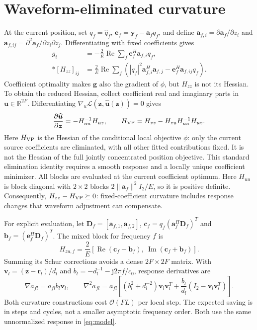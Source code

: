 \documentclass[a4paper,12pt,review]{cas-sc}
\newcommand{\R}{\mathbb R}
\newcommand{\Rea}{\operatorname{Re}}
\begin{document}
\section{Waveform-eliminated curvature}
At the current position, set $q_f=\widehat q_f$, $\bm e_f=\bm y_f-\bm a_fq_f$, and define $\bm a_{f,i}=\partial\bm a_f/\partial z_i$ and $\bm a_{f,ij}=\partial^2\bm a_f/\partial z_i\partial z_j$. Differentiating with fixed coefficients gives
\begin{align}
 g_i&=-\frac{2}{E}\Rea\sum_f\bm e_f^H\bm a_{f,i}q_f,\label{eq:g}\\*
 [H_{zz}]_{ij}&=\frac{2}{E}\Rea\sum_f
 \left(|q_f|^2\bm a_{f,i}^H\bm a_{f,j}-\bm e_f^H\bm a_{f,ij}q_f\right).
 \label{eq:hfixed}
\end{align}
Coefficient optimality makes $\bm g$ also the gradient of $\phi$, but $H_{zz}$ is not its Hessian. To obtain the reduced Hessian, collect coefficient real and imaginary parts in $\bm u\in\R^{2F}$. Differentiating $\nabla_u\mathcal L(\bm z,\widehat{\bm u}(\bm z))=0$ gives
\begin{equation}
 \frac{\partial\widehat{\bm u}}{\partial\bm z}=-H_{uu}^{-1}H_{uz},\qquad
 H_{\rm VP}=H_{zz}-H_{zu}H_{uu}^{-1}H_{uz}.
 \label{eq:schur}
\end{equation}
Here $H_{\rm VP}$ is the Hessian of the conditional local objective $\phi$: only the current source coefficients are eliminated, with all other fitted contributions fixed. It is not the Hessian of the full jointly concentrated position objective. This standard elimination identity \cite{GolubPereyra1973} requires a smooth response and a locally unique coefficient minimizer. All blocks are evaluated at the current coefficient optimum. Here $H_{uu}$ is block diagonal with $2\times2$ blocks $2\|\bm a_f\|^2 I_2/E$, so it is positive definite. Consequently, $H_{zz}-H_{\rm VP}\succeq0$: fixed-coefficient curvature includes response changes that waveform adjustment can compensate.

For explicit evaluation, let $\bm D_f=[\bm a_{f,1},\bm a_{f,2}]$, $\bm c_f=q_f(\bm a_f^H\bm D_f)^T$ and $\bm b_f=(\bm e_f^H\bm D_f)^T$. The mixed block for frequency $f$ is
\begin{equation}
 H_{zu,f}=\frac{2}{E}
 [\Rea(\bm c_f-\bm b_f),\ \operatorname{Im}(\bm c_f+\bm b_f)].
 \label{eq:cross}
\end{equation}
Summing its Schur corrections avoids a dense $2F\times2F$ matrix. With $\bm v_l=(\bm z-\bm r_l)/d_l$ and $b_l=-d_l^{-1}-\mathrm j2\pi f/c_0$, response derivatives are
\begin{equation}
 \nabla a_{fl}=a_{fl}b_l\bm v_l,\qquad
 \nabla^2a_{fl}=a_{fl}\left[(b_l^2+d_l^{-2})\bm v_l\bm v_l^T
 +\frac{b_l}{d_l}(I_2-\bm v_l\bm v_l^T)\right].
 \label{eq:response}
\end{equation}
Both curvature constructions cost $\mathcal O(FL)$ per local step. The expected saving is in steps and cycles, not a smaller asymptotic frequency order. Both use the same unnormalized response in \eqref{eq:model}.
\end{document}
